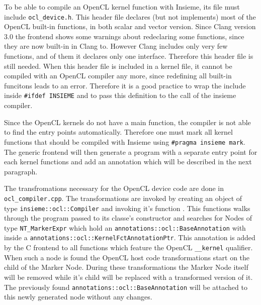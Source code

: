 To be able to compile an OpenCL kernel function with Insieme, its file must include \texttt{ocl\_device.h}. This header file declares (but not implements) most of the OpenCL built-in functions, in both scalar and vector version. Since Clang version 3.0 the frontend shows some warnings about redeclaring some functions, since they are now built-in in Clang to. However Clang includes only very few functions, and of them it declares only one interface. Therefore this header file is still needed. When this header file is included in a kernel file, it cannot be compiled with an OpenCL compiler any more, since redefining all built-in funcitons leads to an error. Therefore it is a good practice to wrap the include inside \texttt{\#ifdef INSIEME} and to pass this definition to the call of the insieme compiler. 

Since the OpenCL kernels do not have a main function, the compiler is not able to find the entry points automatically. Therefore one must mark all kernel functions that should be compiled with Insieme using \texttt{\#pragma insieme mark}. The generic frontend will then generate a program with a separate entry point for each kernel functions and add an annotation which will be described in the next paragraph.

The transfromations necessary for the OpenCL device code are done in \texttt{ocl\_compiler.cpp}. The transformations are invoked by creating an object of type \texttt{insieme::ocl::Compiler} and invoking it's function . This functions walks through the program passed to its classe's constructor and searches for Nodes of type \texttt{NT\_MarkerExpr} which hold an \texttt{annotations::ocl::BaseAnnotation} with inside a \texttt{annotations::ocl::KernelFctAnnotationPtr}. This annotation is added by the C frontend to all functions which feature the OpenCL \texttt{\_\_kernel} qualifier. \\

When such a node is found the OpenCL host code transformations start on the child of the Marker Node. During these transformations the Marker Node itself will be removed while it's child will be replaced with a transformed version of it. The previously found \texttt{annotations::ocl::BaseAnnotation} will be attached to this newly generated node without any changes. \\


